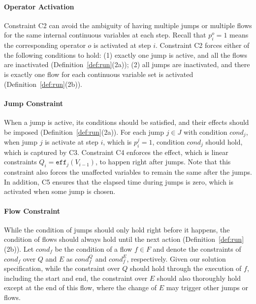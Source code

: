 \documentclass[sigconf]{acmart}
\begin{document}
\paragraph{Operator Activation}
Constraint C2 can avoid the ambiguity of having multiple jumps or multiple flows for the same internal continuous variables at each step. Recall that $p_i^o = 1$ means the corresponding operator $o$ is activated at step $i$. Constraint C2 forces either of the following conditions to hold: (1) exactly one jump is active, and all the flows are inactivated (Definition~\ref{def:run}(2a)); (2) all jumps are inactivated, and there is exactly one flow for each continuous variable set is activated (Definition~\ref{def:run}(2b)).


\paragraph{Jump Constraint}
When a jump is active, its conditions should be satisfied, and their effects should be imposed (Definition~\ref{def:run}(2a)). For each jump $j \in J$ with condition $\textit{cond}_j$, when jump $j$ is activate at step $i$, which is $p_{i}^j = 1$, condition $\textit{cond}_j$ should hold, which is captured by C3. Constraint C4 enforces the effect, which is linear constraints $Q_i = \texttt{eff}_j(V_{i-1})$, to happen right after jumps. Note that this constraint also forces the unaffected variables to remain the same after the jumps. In addition, C5 ensures that the elapsed time during jumps is zero, which is activated when some jump is chosen.


\paragraph{Flow Constraint}
While the condition of jumps should only hold right before it happens, the condition of flows should always hold until the next action (Definition~\ref{def:run}(2b)).
Let $\textit{cond}_f$ be the condition of a flow $f \in F$ and denote the constraints of $\textit{cond}_f$ over $Q$ and $E$ as $\textit{cond}_f^Q$ and $\textit{cond}_f^E$, respectively. Given our solution specification, while the constraint over $Q$ should hold through the execution of $f$, including the start and end, the constraint over $E$ should also thoroughly hold except at the end of this flow, where the change of $E$ may trigger other jumps or flows. 
\end{document}
